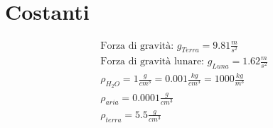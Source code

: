 \section{Costanti}

\begin{gather*}
\text{Forza di gravità: } g_{Terra} = 9.81 \frac{m}{s^2} \\
\text{Forza di gravità lunare: } g_{Luna} = 1.62 \frac{m}{s^2} \\
\rho_{H_2O} = 1 \frac{g}{cm^3} = 0.001 \frac{kg}{cm^3} = 1000 \frac{kg}{m^3} \\
\rho_{aria} = 0.0001 \frac{g}{cm^3} \\
\rho_{terra} = 5.5 \frac{g}{cm^3}
\end{gather*}